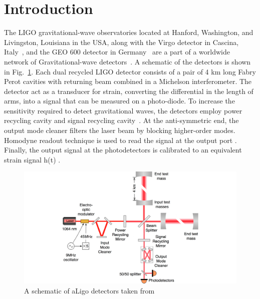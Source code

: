 \documentclass[12pt]{iopart}
\begin{document}
%
%



\section{Introduction}\label{introduction}

The LIGO  gravitational-wave observatories located at Hanford, Washington, and Livingston, Louisiana in the USA, along with the Virgo detector in Cascina, Italy~\cite{virgo}, and the GEO 600 detector in Germany~\cite{german} are a part of a worldwide network of Gravitational-wave detectors~\cite{aligo}. 
A schematic of the detectors is shown in Fig.~\ref{fig:schematic}.
Each dual recycled LIGO detector consists of a pair of 4 km long Fabry Perot cavities with returning beam combined in a Michelson interferometer. The detector act as a transducer for strain, converting the differential in the length of arms, into a signal that can be measured on a photo-diode. To increase the sensitivity required to detect gravitational waves, the detectors employ power recycling cavity and signal recycling cavity~\cite{signalr}. At the anti-symmetric end, the output mode cleaner filters the laser beam by blocking higher-order modes. Homodyne readout technique is used to read the signal at the output port \cite{Fricke_2012}. Finally, the output signal at the photodetectors is calibrated to an equivalent strain signal h(t) \cite{Abbott_2017,Viets_2018}.
\begin{figure}[h]
    \centering
    \includegraphics[width=12cm]{ligo-schematic.png}
    \caption{A schematic of aLigo detectors taken from {~\cite{schematic}} }
    \label{fig:schematic}
\end{figure}
\end{document}
